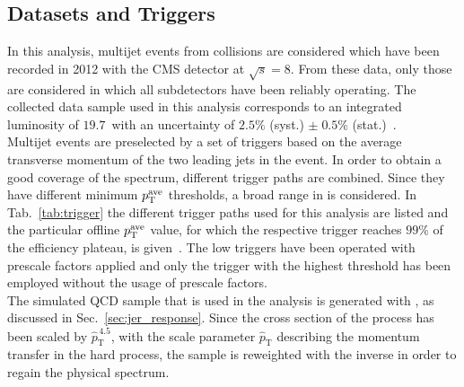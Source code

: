 \subsection{Datasets and Triggers}
\label{subsec:jer_samples_and_trigger}
\begin{table}[!tp]
\centering
\caption{Trigger paths with \ptave thresholds at which the trigger efficiency reaches the $99\%$ efficiency plateau. Thresholds are given for PFCHS jets.}
\label{tab:trigger}
\end{table}  
In this analysis, multijet events from \pp collisions are considered which have been recorded in 2012 with the CMS detector at $\sqrt{s}=8$\tev. From these data, only those are considered in which all subdetectors have been reliably operating. The collected data sample used in this analysis corresponds to an integrated luminosity of $19.7$~\fbinv with an uncertainty of $2.5\%$ (syst.)  $\pm \; 0.5\%$ (stat.)~\cite{CMS-PAS-LUM-13-001}. \\
Multijet events are preselected by a set of triggers based on the average transverse momentum of the two leading jets in the event. In order to obtain a good coverage of the \ptave spectrum, different trigger paths are combined. Since they have different minimum $p_{\text{T}}^\mathrm{ave}$ thresholds, a broad range in \ptave is considered. In Tab.~\ref{tab:trigger} the different trigger paths used for this analysis are listed and the particular offline $p_{\text{T}}^\mathrm{ave}$ value, for which the respective trigger reaches $99\%$ of the efficiency plateau, is given~\cite{DRathjens}. The low \ptave triggers have been operated with prescale factors applied and only the trigger with the highest \ptave threshold has been employed without the usage of prescale factors. \\
The simulated QCD sample that is used in the analysis is generated with \pythia, as discussed in Sec.~\ref{sec:jer_response}. Since the cross section of the process has been scaled by $\hat{p}_\mathrm{T}^{\,4.5}$, with the scale parameter $\hat{p}_\mathrm{T}$ describing the momentum transfer in the hard process, the sample is reweighted with the inverse in order to regain the physical spectrum.  

